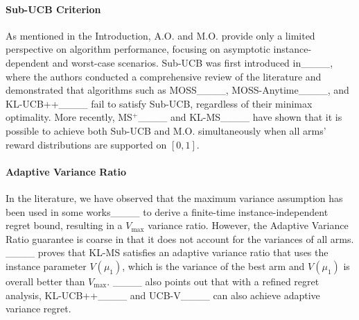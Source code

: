 \paragraph{Sub-UCB Criterion}
As mentioned in the Introduction, A.O. and M.O. provide only a limited perspective on algorithm performance, focusing on asymptotic instance-dependent and worst-case scenarios. Sub-UCB was first introduced in____, where the authors conducted a comprehensive review of the literature and demonstrated that algorithms such as MOSS____, MOSS-Anytime____, and KL-UCB++____ fail to satisfy Sub-UCB, regardless of their minimax optimality.
More recently, MS$^+$____ and KL-MS____ have shown that it is possible to achieve both Sub-UCB and M.O. simultaneously when all arms' reward distributions are supported on $[0,1]$.

\paragraph{Adaptive Variance Ratio}
In the literature, we have observed that the maximum variance assumption has been used in some works____ to derive a finite-time instance-independent regret bound, resulting in a $V_{\max}$ variance ratio.
However, the Adaptive Variance Ratio guarantee is coarse in that it does not account for the variances of all arms. ____ proves that KL-MS satisfies an adaptive variance ratio that uses the instance parameter $V(\mu_1)$, which is the variance of the best arm and $V(\mu_1)$ is overall better than $V_{\max}$.
____ also points out that with a refined regret analysis, KL-UCB++____ and UCB-V____ can also achieve adaptive variance regret.